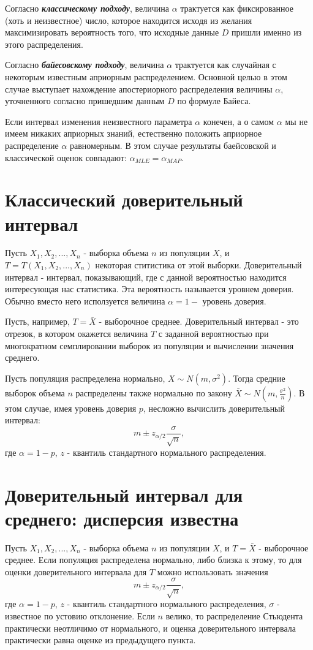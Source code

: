 Согласно \textbf{\textit{классическому подходу}}, величина $\alpha$ трактуется как фиксированное (хоть и неизвестное) число, которое находится исходя из желания максимизировать вероятность того, что исходные данные $D$ пришли именно из этого распределения.

Согласно \textbf{\textit{байесовскому подходу}}, величина $\alpha$ трактуется как случайная с некоторым известным априорным распределением. Основной целью в этом случае выступает нахождение апостериорного распределения величины $\alpha$, уточненного согласно пришедшим данным $D$ по формуле Байеса.

Если интервал изменения неизвестного параметра $\alpha$ конечен, а о самом $\alpha$ мы не имеем никаких априорных знаний, естественно положить априорное распределение $\alpha$ равномерным. В этом случае результаты баейсовской и классической оценок совпадают: $\alpha_{MLE} = \alpha_{MAP}$.


\section{Классический доверительный интервал}

Пусть $X_1, X_2, ..., X_n$ - выборка объема $n$ из популяции $X$, и $T = T(X_1, X_2, ..., X_n)$ некоторая ститистика от этой выборки.
Доверительный интервал - интервал, показывающий, где с данной вероятностью находится интересующая нас статистика. Эта вероятность называется уровнем доверия. Обычно вместо него исползуется величина $\alpha = 1 -$ уровень доверия.

Пусть, например, $T = \bar{X}$ - выборочное среднее. Доверительный интервал - это отрезок, в котором окажется величина $T$ с заданной вероятностью при многократном семплировании выборок из популяции и вычислении значения среднего.

Пусть популяция распределена нормально, $X \sim N(m, \sigma^2)$. Тогда средние выборок объема $n$ распределены также нормально по закону $\bar{X} \sim N(m, \frac{\sigma^2}{n})$. В этом случае, имея уровень доверия $p$, несложно вычислить доверительный интервал:
$$
m \pm z_{\alpha/2}\frac{\sigma}{\sqrt{n}},
$$
где $\alpha = 1 - p$, $z$ - квантиль стандартного нормального распределения.


\section{Доверительный интервал для среднего: дисперсия известна}

Пусть $X_1, X_2, ..., X_n$ - выборка объема $n$ из популяции $X$, и $T = \bar{X}$ - выборочное среднее.
Если популяция распределена нормально, либо близка к этому, то для оценки доверительного интервала для $T$ можно использовать значения
$$
m \pm z_{\alpha/2}\frac{\sigma}{\sqrt{n}},
$$
где $\alpha = 1 - p$, $z$ - квантиль стандартного нормального распределения, $\sigma$ - известное по устовию отклонение.
Если $n$ велико, то распределение Стьюдента практически неотличимо от нормального, и оценка доверительного интервала практически равна оценке из предыдущего пункта.


